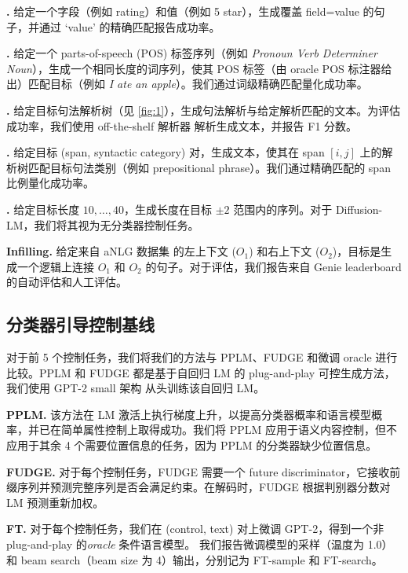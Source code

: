 \documentclass{article}
\begin{document}
\textbf{\Content.} 给定一个字段（例如 rating）和值（例如 5 star），生成覆盖 field=value 的句子，并通过 `value' 的精确匹配报告成功率。




\textbf{\POS.} 给定一个 parts-of-speech (POS) 标签序列（例如 \textit{Pronoun Verb Determiner Noun}），生成一个相同长度的词序列，使其 POS 标签（由 oracle POS 标注器给出）匹配目标（例如 \textit{I ate an apple}）。我们通过词级精确匹配量化成功率。


\textbf{\Syntax.} 给定目标句法解析树（见 \cref{fig:1}），生成句法解析与给定解析匹配的文本。为评估成功率，我们使用 off-the-shelf 解析器 \cite{kitaev-klein-2018-constituency} 解析生成文本，并报告 F1 分数。


\textbf{\Spans.} %
给定目标 (span, syntactic category) 对，生成文本，使其在 span $[i,j]$ 上的解析树匹配目标句法类别（例如 prepositional phrase）。我们通过精确匹配的 span 比例量化成功率。


\textbf{\Length.} 给定目标长度 $10, \dots, 40$，生成长度在目标 $\pm 2$ 范围内的序列。对于 Diffusion-LM，我们将其视为无分类器控制任务。

\textbf{Infilling.} 给定来自 aNLG 数据集 \cite{bhagavatula2020abductive} 的左上下文 ($O_1$) 和右上下文 ($O_2$)，目标是生成一个逻辑上连接 $O_1$ 和 $O_2$ 的句子。对于评估，我们报告来自 Genie leaderboard \cite{Khashabi2021GENIEAL} 的自动评估和人工评估。


\subsection{分类器引导控制基线}

对于前 5 个控制任务，我们将我们的方法与 PPLM、FUDGE 和微调 oracle 进行比较。PPLM 和 FUDGE 都是基于自回归 LM 的 plug-and-play 可控生成方法，我们使用 GPT-2 small 架构 \cite{radford2019language} 从头训练该自回归 LM。


\textbf{PPLM\cite{Dathathri2020Plug}.} 该方法在 LM 激活上执行梯度上升，以提高分类器概率和语言模型概率，并已在简单属性控制上取得成功。我们将 PPLM 应用于语义内容控制，但不应用于其余 4 个需要位置信息的任务，因为 PPLM 的分类器缺少位置信息。

\textbf{FUDGE\cite{yang-klein-2021-fudge}.} 对于每个控制任务，FUDGE 需要一个 future discriminator，它接收前缀序列并预测完整序列是否会满足约束。在解码时，FUDGE 根据判别器分数对 LM 预测重新加权。

\textbf{FT.} 对于每个控制任务，我们在 (control, text) 对上微调 GPT-2，得到一个非 plug-and-play 的\emph{oracle} 条件语言模型。
我们报告微调模型的采样（温度为 1.0）和 beam search（beam size 为 4）输出，分别记为 FT-sample 和 FT-search。
\end{document}
